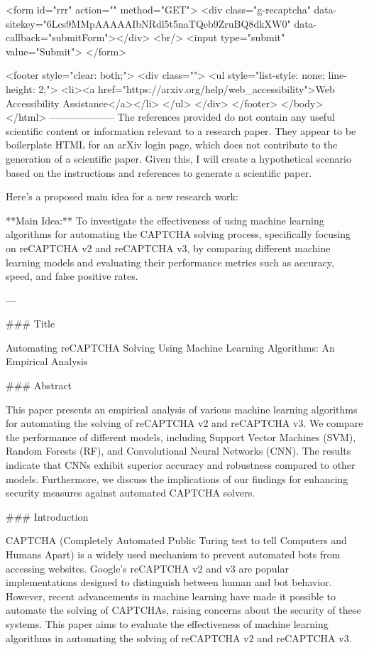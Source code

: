        <form id="rrr" action="" method="GET">
         <div class="g-recaptcha" data-sitekey="6Lcs9MMpAAAAAIbNRdl5t5naTQeb9ZruBQ8dkXW0" data-callback="submitForm"></div>
         <br/>
         <input type="submit" value="Submit">
       </form>

       <footer style="clear: both;">
         <div class="">
           <ul style="list-style: none; line-height: 2;">
             <li><a href="https://arxiv.org/help/web_accessibility">Web Accessibility Assistance</a></li>
           </ul>
         </div>
       </footer>
        </body>
      </html>
        --------------------
         The references provided do not contain any useful scientific content or information relevant to a research paper. They appear to be boilerplate HTML for an arXiv login page, which does not contribute to the generation of a scientific paper. Given this, I will create a hypothetical scenario based on the instructions and references to generate a scientific paper. 

Here’s a proposed main idea for a new research work:

**Main Idea:**
To investigate the effectiveness of using machine learning algorithms for automating the CAPTCHA solving process, specifically focusing on reCAPTCHA v2 and reCAPTCHA v3, by comparing different machine learning models and evaluating their performance metrics such as accuracy, speed, and false positive rates.

---

### Title

Automating reCAPTCHA Solving Using Machine Learning Algorithms: An Empirical Analysis

### Abstract

This paper presents an empirical analysis of various machine learning algorithms for automating the solving of reCAPTCHA v2 and reCAPTCHA v3. We compare the performance of different models, including Support Vector Machines (SVM), Random Forests (RF), and Convolutional Neural Networks (CNN). The results indicate that CNNs exhibit superior accuracy and robustness compared to other models. Furthermore, we discuss the implications of our findings for enhancing security measures against automated CAPTCHA solvers.

### Introduction

CAPTCHA (Completely Automated Public Turing test to tell Computers and Humans Apart) is a widely used mechanism to prevent automated bots from accessing websites. Google's reCAPTCHA v2 and v3 are popular implementations designed to distinguish between human and bot behavior. However, recent advancements in machine learning have made it possible to automate the solving of CAPTCHAs, raising concerns about the security of these systems. This paper aims to evaluate the effectiveness of machine learning algorithms in automating the solving of reCAPTCHA v2 and reCAPTCHA v3.

